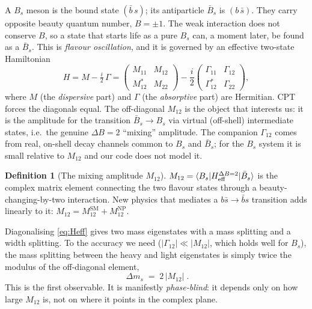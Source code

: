 \documentclass[11pt]{article}
\newcommand{\Bs}{B_s}
\newcommand{\Bsbar}{\bar B_s}
\newcommand{\dms}{\Delta m_s}
\newcommand{\Mtwelve}{M_{12}}
\newcommand{\MtwelveNP}{M_{12}^{\mathrm{NP}}}
\newcommand{\MtwelveSM}{M_{12}^{\mathrm{SM}}}
\theoremstyle{definition}
\newtheorem{definition}{Definition}
\begin{document}
A $\Bs$ meson is the bound state $(\bar b\, s)$; its antiparticle $\Bsbar$ is
$(b\,\bar s)$. They carry opposite beauty quantum number, $B=\pm 1$. The weak
interaction does not conserve $B$, so a state that starts life as a pure $\Bs$
can, a moment later, be found as a $\Bsbar$. This is \emph{flavour oscillation},
and it is governed by an effective two-state Hamiltonian
\begin{equation}
H = M - \tfrac{i}{2}\,\Gamma
= \begin{pmatrix} M_{11} & \Mtwelve \\ \Mtwelve^* & M_{22}\end{pmatrix}
 - \frac{i}{2}\begin{pmatrix} \Gamma_{11} & \Gamma_{12} \\ \Gamma_{12}^* & \Gamma_{22}\end{pmatrix},
\label{eq:Heff}
\end{equation}
where $M$ (the \emph{dispersive} part) and $\Gamma$ (the \emph{absorptive} part)
are Hermitian. CPT forces the diagonals equal. The off-diagonal $\Mtwelve$ is the
object that interests us: it is the amplitude for the transition
$\Bsbar \to \Bs$ via virtual (off-shell) intermediate states, i.e.\ the genuine
$\Delta B=2$ ``mixing'' amplitude. The companion $\Gamma_{12}$ comes from real,
on-shell decay channels common to $\Bs$ and $\Bsbar$; for the $\Bs$ system it is
small relative to $\Mtwelve$ and our code does not model it.

\begin{definition}[The mixing amplitude $\Mtwelve$]
$\Mtwelve = \langle \Bs | H_{\rm eff}^{\Delta B=2} | \Bsbar\rangle$ is the
complex matrix element connecting the two flavour states through a
beauty-changing-by-two interaction. New physics that mediates a $b\bar s \to
\bar b s$ transition adds linearly to it:
$\Mtwelve = \MtwelveSM + \MtwelveNP$.
\end{definition}

Diagonalising \eqref{eq:Heff} gives two mass eigenstates with a mass splitting
and a width splitting. To the accuracy we need ($|\Gamma_{12}|\ll|\Mtwelve|$,
which holds well for $\Bs$), the mass splitting between the heavy and light
eigenstates is simply twice the modulus of the off-diagonal element,
\begin{equation}
\boxed{\;\dms \;=\; 2\,|\Mtwelve|\;.}
\label{eq:dms}
\end{equation}
This is the first observable. It is manifestly \emph{phase-blind}: it depends
only on how large $\Mtwelve$ is, not on where it points in the complex plane.
\end{document}
